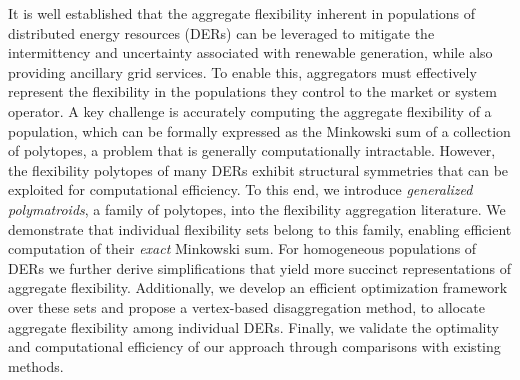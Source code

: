 It is well established that the aggregate flexibility inherent in populations of distributed energy resources (DERs) can be leveraged to mitigate the intermittency and uncertainty associated with renewable generation, while also providing ancillary grid services. To enable this, aggregators must effectively represent the flexibility in the populations they control to the market or system operator. A key challenge is accurately computing the aggregate flexibility of a population, which can be formally expressed as the Minkowski sum of a collection of polytopes, a problem that is generally computationally intractable. However, the flexibility polytopes of many DERs exhibit structural symmetries that can be exploited for computational efficiency. To this end, we introduce \textit{generalized polymatroids}, a family of polytopes, into the flexibility aggregation literature. We demonstrate that individual flexibility sets belong to this family, enabling efficient computation of their \textit{exact} Minkowski sum. For homogeneous populations of DERs we further derive simplifications that yield more succinct representations of aggregate flexibility. Additionally, we develop an efficient optimization framework over these sets and propose a vertex-based disaggregation method, to allocate aggregate flexibility among individual DERs. Finally, we validate the optimality and computational efficiency of our approach through comparisons with existing methods.